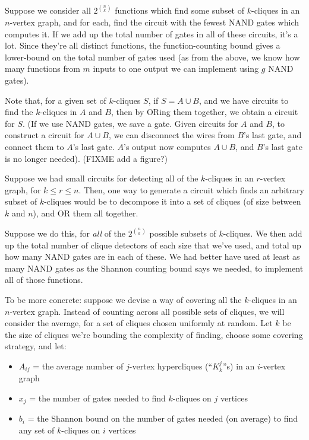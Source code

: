 \documentclass[12pt]{article}
\theoremstyle{definition}
\begin{document}
Suppose we consider all $2^{n \choose k}$ functions which find some subset
of $k$-cliques in an $n$-vertex graph, and for each, find the circuit with
the fewest NAND gates which computes it. If we add up the total number of
gates in all of these circuits,
it's a lot. Since they're all distinct functions, the
function-counting bound gives a lower-bound on
the total number of gates used (as from the
above, we know how many functions from $m$ inputs to one output
we can implement using $g$ NAND gates).

Note that, for a given set of $k$-cliques $S$, if $S = A \cup B$, and we
have circuits to find the $k$-cliques in $A$ and $B$, then by ORing them
together, we obtain a circuit for $S$. (If we use NAND gates, we
save a gate. Given circuits for $A$ and $B$, to construct a circuit
for $A \cup B$, we can disconnect the wires from $B$'s last gate, and
connect them to $A$'s last gate. $A$'s output now computes $A \cup B$,
and $B$'s last gate is no longer needed). (FIXME add a figure?)

Suppose we had small circuits for detecting all of the $k$-cliques
in an $r$-vertex graph, for $k \le r \le n$.
Then, one way to generate a circuit which finds an arbitrary subset
of $k$-cliques would be to decompose it into a set of
cliques (of size between $k$ and $n$), and OR them all together.

Suppose we do this, for {\em all} of the $2^{n \choose k}$ possible subsets of
$k$-cliques. We then add up the total number of clique detectors of each
size that we've used, and total up how many NAND gates are in each of these.
We had better have used at least as many NAND gates as the Shannon counting
bound says we needed, to implement all of those functions.

To be more concrete: suppose we
devise a way of covering all the $k$-cliques in an $n$-vertex
graph. Instead of counting across all possible sets of cliques, we will
consider the average, for a set of cliques chosen uniformly at random.
Let $k$ be the size of cliques we're bounding the complexity of finding,
choose some covering strategy, and let:

\begin{itemize}

\item $A_{ij}$ = the average number of $j$-vertex hypercliques (``$K^j_k$''s)
in an $i$-vertex graph

\item $x_{j}$ = the number of gates needed to find $k$-cliques on $j$ vertices

\item $b_{i}$ = the Shannon bound on the number of
gates needed (on average) to find any set of $k$-cliques on $i$ vertices

\end{itemize}
\end{document}
